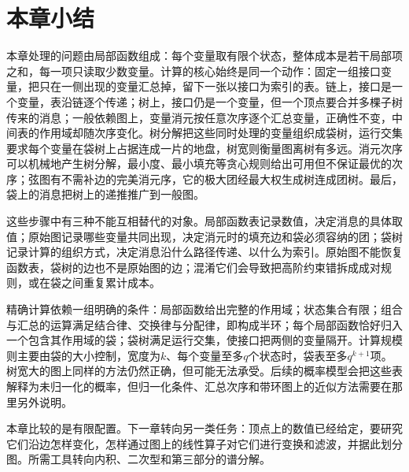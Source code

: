 
\section{本章小结}
\label{sec:graph-dp-summary}

本章处理的问题由局部函数组成：每个变量取有限个状态，整体成本是若干局部项之和，每一项只读取少数变量。计算的核心始终是同一个动作：固定一组接口变量，把只在一侧出现的变量汇总掉，留下一张以接口为索引的表。链上，接口是一个变量，表沿链逐个传递；树上，接口仍是一个变量，但一个顶点要合并多棵子树传来的消息；一般依赖图上，变量消元按任意次序逐个汇总变量，正确性不变，中间表的作用域却随次序变化。树分解把这些同时处理的变量组织成袋树，运行交集要求每个变量在袋树上占据连成一片的地盘，树宽则衡量图离树有多远。消元次序可以机械地产生树分解，最小度、最小填充等贪心规则给出可用但不保证最优的次序；弦图有不需补边的完美消元序，它的极大团经最大权生成树连成团树。最后，袋上的消息把树上的递推推广到一般图。

这些步骤中有三种不能互相替代的对象。局部函数表记录数值，决定消息的具体取值；原始图记录哪些变量共同出现，决定消元时的填充边和袋必须容纳的团；袋树记录计算的组织方式，决定消息沿什么路径传递、以什么为索引。原始图不能恢复函数表，袋树的边也不是原始图的边；混淆它们会导致把高阶约束错拆成成对规则，或在袋之间重复累计成本。

精确计算依赖一组明确的条件：局部函数给出完整的作用域；状态集合有限；组合与汇总的运算满足结合律、交换律与分配律，即构成半环；每个局部函数恰好归入一个包含其作用域的袋；袋树满足运行交集，使接口把两侧的变量隔开。计算规模则主要由袋的大小控制，宽度为$k$、每个变量至多$q$个状态时，袋表至多$q^{k+1}$项。树宽大的图上同样的方法仍然正确，但可能无法承受。后续的概率模型会把这些表解释为未归一化的概率，但归一化条件、汇总次序和带环图上的近似方法需要在那里另外说明。

本章比较的是有限配置。下一章转向另一类任务：顶点上的数值已经给定，要研究它们沿边怎样变化，怎样通过图上的线性算子对它们进行变换和滤波，并据此划分图。所需工具转向内积、二次型和第三部分的谱分解。
